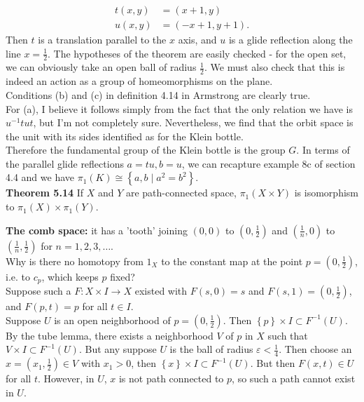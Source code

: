 \documentclass[a4paper]{article}
\begin{document}
\begin{align*}
    t(x,y) &= (x+1,y)\\
    u(x,y) &= (-x+1, y+1).
\end{align*}
Then $t$ is a translation parallel to the $x$ axis, and $u$ is a
glide reflection along the line
$x = \frac{1}{2}$. The hypotheses of the theorem are easily checked - for the
open set, we can obviously take an open ball of radius $\frac{1}{2}$. We must
also check that this is indeed an action as a group of homeomorphisms on the
plane.\\
Conditions (b) and (c) in definition 4.14 in Armstrong are clearly true.\\
For (a), I believe it follows simply from the fact that the only relation we
have is  $u^{-1}tut$, but I'm not completely sure. Nevertheless, we find that 
the orbit space is the unit with its sides identified as for the Klein
bottle.\\
Therefore the fundamental group of the Klein bottle is the group $G$.
In terms of the parallel glide reflections $a = tu, b=u$, we can recapture
example 8c of section 4.4 and we have
$\pi_1 (K) \cong \left\{ a,b  \mid a^2 = b^2 \right\} $.\\
\linebreak
\textbf{Theorem 5.14} If $X$ and $Y$ are path-connected space, $\pi_1 (X \times
Y)$ is isomorphism to $\pi_1 (X) \times \pi_1 (Y)$.\\
\linebreak

\textbf{The comb space:} it has a 'tooth' joining
$(0,0)$ to $(0, \frac{1}{2})$ and
$(\frac{1}{n},0)$ to $(\frac{1}{n}, \frac{1}{2})$ for
$n = 1, 2, 3, \ldots$.\\
\linebreak
Why is there no homotopy from $1_X$ to the constant
map at the point $p=(0, \frac{1}{2})$, i.e. to $c_p$, which
keeps $p$ fixed?\\
\linebreak
Suppose such a $F  \colon X \times I \to X$ existed with
$F(s,0) = s$ and
$F(s,1) = (0, \frac{1}{2})$, and
$F(p, t) = p$ for all $t \in I$.\\
\linebreak
Suppose $U$ is an open neighborhood of $p = (0, \frac{1}{2})$.
Then $  \left\{ p \right\} \times I
\subset F^{-1}(U)$. By the tube lemma, there exists
a neighborhood $V$ of $p$ in $X$ such that
$V \times I \subset F^{-1}(U)$. But any suppose
$U$ is the ball of radius $\varepsilon < \frac{1}{4}$. Then
choose an $x = (x_1, \frac{1}{2}) \in V$ with $x_1 >0$, then
$\left\{ x \right\} \times I \subset 
F^{-1}(U)$. But then
$F(x,t) \in U$ for all $t$. However, in $U$, $x$ is not
path connected to $p$, so such a path cannot exist in $U$.\\
\linebreak
\end{document}
